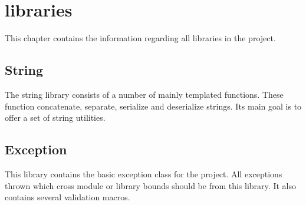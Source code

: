\chapter{libraries}
\label{chapter:libraries}

This chapter contains the information regarding all libraries in the
project.


\section{String}
\label{section:library:string}

The string library consists of a number of mainly templated functions. These
function concatenate, separate, serialize and deserialize strings. Its main
goal is to offer a set of string utilities.


\section{Exception}
\label{section:library:exception}

This library contains the basic exception class for the project. All
exceptions thrown which cross module or library bounds should be from this
library. It also contains several validation macros.
